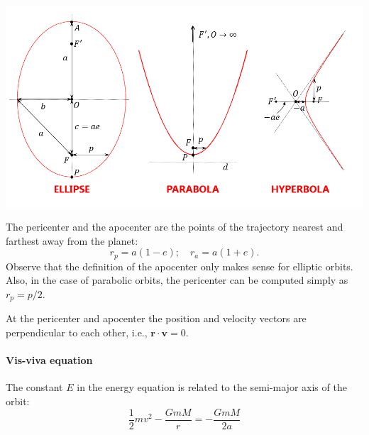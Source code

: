 \begin{center}
\includegraphics[width=\textwidth]{figs/conics.png}
\end{center}

The pericenter and the apocenter are the points of 
the trajectory nearest and farthest away from the planet:
%
\begin{equation}
r_p = a(1-e);\quad r_a = a(1+e).
\end{equation}
%
Observe that the definition of the apocenter only makes sense for elliptic 
orbits. Also, in the case of parabolic orbits, the pericenter can be computed 
simply as $r_p = p/2$.

At the pericenter and apocenter the position and velocity vectors are 
perpendicular to each other, i.e., $\bm r \cdot \bm v = 0$.

\paragraph{Vis-viva equation}

The constant $E$ in the energy equation is related to the semi-major axis of 
the orbit:
%
\begin{equation}
\frac{1}{2}mv^2 -\frac{GmM}{r} = -\frac{GmM}{2a}
\end{equation}
%

